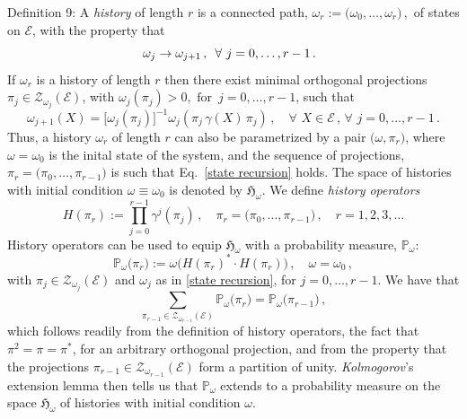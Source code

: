 \documentclass[12pt]{article}
\begin{document}
{{Definition 9}: A \textit{history} of length $r$ is a connected path, 
${\omega}_{r}:= \big(\omega_0, \dots, \omega_{r}\big)\,,$ of states on $\mathcal{E}$, with the property that
\begin{equation}\label{history}
\hspace{3.5cm} \omega_j \rightarrow \omega_{j+1}\,, \, \, \,\forall \,\,j=0, \dots, r-1\,.\hspace{3.7cm} \square
\end{equation}
If ${\omega}_{r}$ is a history of length $r$ then there exist minimal orthogonal projections $\pi_j \in \mathcal{Z}_{\omega_j}(\mathcal{E})$, with $\omega_{j}(\pi_j)>0, \text{ for }\, j=0, \dots, r-1$,  such that 
\begin{equation}\label{state recursion}
 \omega_{j+1}(X)= \big[\omega_{j}(\pi_j)\big]^{-1} \omega_{j}(\pi_j \, \gamma(X)\, \pi_j)\,, \quad\forall\,\, X\in \mathcal{E}\,,\,\forall\,\,j=0,\dots, r-1\,.
\end{equation}
Thus, a history ${\omega}_r$ of length $r$ can also be parametrized by a pair 
$\big(\omega, {\pi}_r \big)$, where $\omega=\omega_0$ is the inital state of the system, and the sequence 
of projections, ${\pi}_r =\big(\pi_0, \dots, \pi_{r-1}\big)$ is such that Eq.~\eqref{state recursion} holds. The 
space of histories with initial condition $\omega\equiv \omega_0$ is denoted by $\mathfrak{H}_{\omega}$.
We define \textit{history operators}
\begin{equation}
H({\pi}_r):= \prod_{j=0}^{r-1}\gamma^{j}(\pi_j)\,, \quad {\pi}_r =\big(\pi_0, \dots, \pi_{r-1}\big)\,,\quad r=1,2,3,\dots
\end{equation}
History operators can be used to equip $\mathfrak{H}_{\omega}$ with a probability measure, $\mathbb{P}_{\omega}$:
\begin{equation}\label{prob of history}
\mathbb{P}_{\omega}\big({\pi}_r\big):= \omega\big( H({\pi}_r)^{*}\cdot H({\pi}_r)\big)\,,\quad \omega =\omega_{0} \,,
\end{equation}
with $\pi_{j} \in \mathcal{Z}_{\omega_j}(\mathcal{E})$ and $\omega_j$ as in \eqref{state recursion}, for $j=0, \dots, r-1$. 
We have that
$$\sum_{\pi_{r-1} \in \mathcal{Z}_{\omega_{r-1}}(\mathcal{E})} \mathbb{P}_{\omega}\big({\pi}_r\big) = 
\mathbb{P}_{\omega}\big({\pi}_{r-1}\big)\,,$$
which follows readily from the definition of history operators, the fact that $\pi^{2}=\pi= \pi^{*}$, for an arbitrary orthogonal projection, and from the property that the projections $\pi_{r-1}\in \mathcal{Z}_{\omega_{r-1}}(\mathcal{E})$ form a partition of unity. \textit{Kolmogorov}'s extension lemma then tells us that $\mathbb{P}_{\omega}$ extends to a probability measure on the space $\mathfrak{H}_{\omega}$ of histories with initial condition $\omega$. 

}
\end{document}
